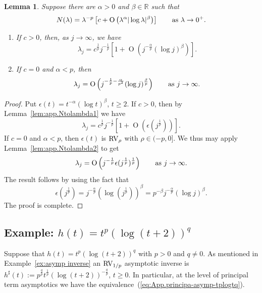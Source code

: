\documentclass[10pt, a4paper]{amsart}
\newcommand{\R}{\mathbb{R}}
\newcommand{\op}{\operatorname}
\numberwithin{equation}{section}
\newtheorem{lemma}[theorem]{Lemma}
\theoremstyle{definition}
\theoremstyle{remark}
\newcommand{\RV}{\textup{RV}}
\begin{document}
\begin{lemma}\label{lem:app.example-tp}
 Suppose there are $\alpha>0$ and $\beta \in \R$ such that
 \begin{equation*}
 N(\lambda) = \lambda^{-p}\left[ c+ \op{O}\left(\lambda^{\alpha}|\log \lambda|^{\beta}\right)\right]  \qquad \textup{as}\ \lambda\rightarrow 0^+.
\end{equation*}
\begin{enumerate}
 \item[(i)] If $c>0$, then, as $j\rightarrow \infty$, we have
 \begin{equation*}
 \lambda_j = c^{\frac1p}j^{-\frac1p}\left[ 1+ \op{O}\left( j^{-\frac{\alpha}{p}}(\log j)^\beta\right)\right].
\end{equation*}

\item[(ii)] If $c=0$ and $\alpha<p$, then
\begin{equation*}
 \lambda_j = \op{O}\left( j^{-\frac1p-\frac{\alpha}{p^2}}(\log j)^{\frac{\beta}{p}}\right)  \qquad \textup{as}\ j\rightarrow \infty.
\end{equation*}
\end{enumerate}
\end{lemma}
\begin{proof}
 Put $\epsilon(t)=t^{-\alpha}(\log t)^\beta$, $t\geq 2$. If $c>0$, then by Lemma~\ref{lem:app.Ntolambda1} we have
 \begin{equation*}
  \lambda_j = c^{\frac1p}j^{-\frac1p}\left[ 1+ \op{O}\left( \epsilon(j^{\frac1p})\right)\right].
\end{equation*}
If $c=0$ and $\alpha <p$, then $\epsilon(t)$ is $\RV_\rho$ with $\rho\in(-p,0]$. We thus may apply Lemma~\ref{lem:app.Ntolambda2} to get
\begin{equation*}
 \lambda_j = \op{O}\left( j^{-\frac1p}\epsilon(j^{\frac1p})^{\frac1p}\right)  \qquad \textup{as}\ j\rightarrow \infty.
\end{equation*}
The result follows by using the fact that
\begin{equation*}
 \epsilon(j^{\frac1p}) = j^{-\frac{\alpha}{p}} \left(\log (j^{\frac1p})\right)^\beta=p^{-\beta}  j^{-\frac{\alpha}{p}} (\log j)^\beta.
\end{equation*}
The proof is complete.
\end{proof}

\subsection{Example: $h(t)=t^p(\log(t+2))^q$}\label{eq:app.example-N2lambda-logq} Suppose that $h(t)=t^p(\log(t+2))^q$ with $p>0$ and $q\neq 0$. As mentioned in Example~\ref{ex:asymp inverse} an $\RV_{1/p}$ asymptotic inverse is  $h^\sharp(t):= p^{\frac{q}{p}} t^{\frac{1}{p}} \left(\log(t+2)\right)^{-\frac{q}{p}}$, $t\geq 0$. In particular, at the level of principal term asymptotics we have the equivalence~(\ref{eq:App.principa-asymp-tplogtq}). 
\end{document}
